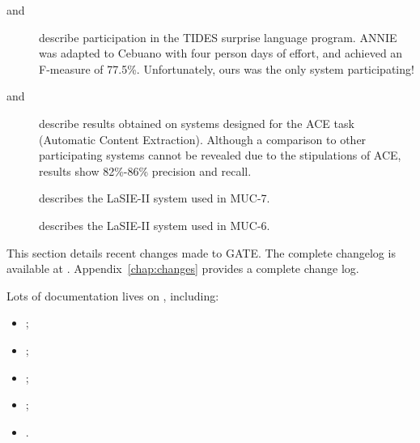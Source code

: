 \begin{description}
\item[\cite{May03d} and \cite{May03g}] describe participation in the
TIDES surprise language program. ANNIE was adapted to Cebuano with four person days
of effort, and achieved an F-measure of 77.5\%. Unfortunately, ours was the only
system participating!

\item[\cite{Maynard02} and \cite{Maynard03}] describe results obtained on
systems designed for the ACE task (Automatic Content Extraction). Although a comparison
to other participating systems cannot be revealed due to the stipulations of ACE,
results show 82\%-86\% precision and recall.

\item[\cite{Hum98a}] describes the LaSIE-II system used in MUC-7.

\item[\cite{Gai95b}] describes the LaSIE-II system used in MUC-6.

\end{description}


This section details recent changes made to GATE.
\ifprintedbook
  The complete changelog is available at .
\else
  Appendix~\ref{chap:changes} provides a complete change log.
\fi

\nestedtrue



\nestedfalse


Lots of documentation lives on 
, including:
\begin{itemize}
\item {};

\item {};

\item {};

\item {};

\item {}.
\end{itemize}

